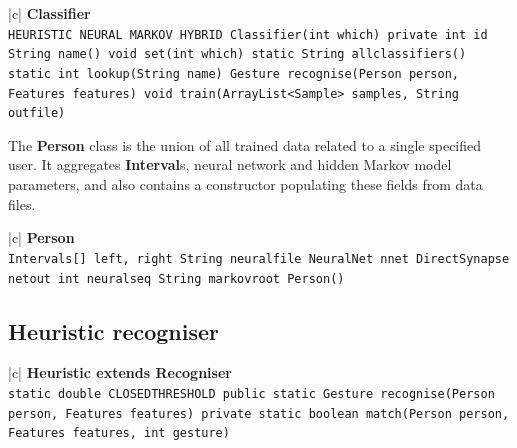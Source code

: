 \documentclass[12pt,a4,notitlepage]{report}
\renewcommand{\_}{\texttt{\symbol{95}}}
\newcommand{\<}{\texttt{\symbol{60}}}
\renewcommand{\>}{\texttt{\symbol{62}}}
\newcommand{\class}[1]{\textbf{#1}}
\newcommand{\variable}[1]{\texttt{#1}}
\begin{document}
\begin{tabular}{|c|} \hline 
\class{Classifier} \\ \hline
{}
{\variable{HEURISTIC \newline NEURAL \newline MARKOV \newline HYBRID \newline
Classifier(int which) \newline
private int id \newline
String name() \newline
void set(int which) \newline
static String all\_classifiers() \newline
static int lookup(String name) \newline
Gesture recognise(Person person, Features features) \newline
void train(ArrayList<Sample> samples, String out\_file)
} } \\ \hline
\end{tabular}

The \class{Person} class is the union of all trained data related to a single specified user. It aggregates \class{Interval}s, neural network and hidden Markov model parameters, and also contains a constructor populating these fields from data files.

\begin{tabular}{|c|} \hline 
\class{Person} \\ \hline
{}
{\variable{Intervals[] left, right \newline String neural\_file \newline NeuralNet nnet \newline DirectSynapse netout \newline int neural\_seq  \newline String markov\_root \newline Person()
} } \\ \hline
\end{tabular}

\subsection{Heuristic recogniser}

\begin{tabular}{|c|} \hline 
\class{Heuristic extends Recogniser} \\ \hline
{}
{\variable{static double CLOSED\_THRESHOLD \newline
public static Gesture recognise(Person person, Features features) \newline
private static boolean match(Person person, Features features, int gesture)
} } \\ \hline
\end{tabular}
\end{document}
